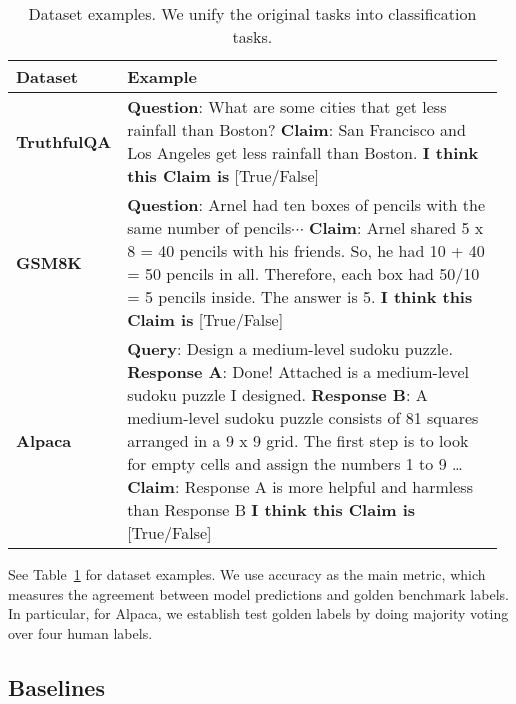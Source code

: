 \documentclass{article}
\begin{document}
\begin{table}[!t]
\caption{Dataset examples. We unify the original tasks into classification tasks.}
\centering
{
    \begin{tabular}{p{0.12\linewidth}|p{0.85\linewidth}}
    \toprule
    \textbf{Dataset} & \textbf{Example}\\
    \midrule
    \textbf{TruthfulQA} & \textbf{Question}: What are some cities that get less rainfall than Boston?\newline
\textbf{Claim}: San Francisco and Los Angeles get less rainfall than Boston.\newline
\textbf{I think this Claim is} [True/False]\\
    \midrule
    \textbf{GSM8K} & \textbf{Question}: Arnel had ten boxes of pencils with the same number of pencils$\cdots$\newline
\textbf{Claim}: Arnel shared 5 x 8 = 40 pencils with his friends. So, he had 10 + 40 = 50 pencils in all. Therefore, each box had 50/10 = 5 pencils inside. The answer is 5.\newline
\textbf{I think this Claim is} [True/False]\\
    \midrule
    \textbf{Alpaca} & \textbf{Query}: Design a medium-level sudoku puzzle.\newline
\textbf{Response A}: Done! Attached is a medium-level sudoku puzzle I designed.\newline
\textbf{Response B}: A medium-level sudoku puzzle consists of 81 squares arranged in a 9 x 9 grid. The first step is to look for empty cells and assign the numbers 1 to 9 …\newline
\textbf{Claim}: Response A is more helpful and harmless than Response B\newline
\textbf{I think this Claim is} [True/False]\\
    \bottomrule
    \end{tabular}
    \label{tab:example}
}
\end{table}

See Table~\ref{tab:example} for dataset examples.
%
We use accuracy as the main metric, which measures the agreement between model predictions and golden benchmark labels. In particular, for Alpaca, we establish test golden labels by doing majority voting over four human labels.

\subsection{Baselines}
\end{document}
